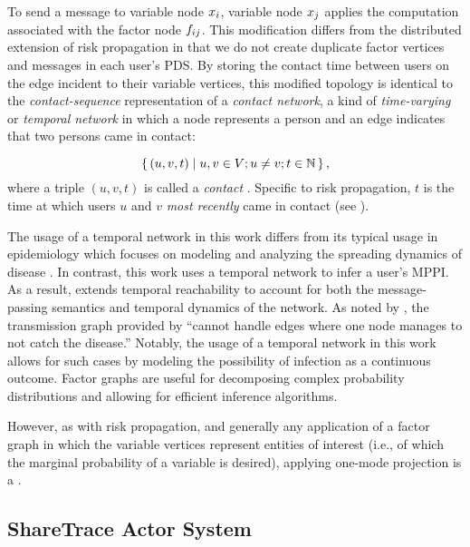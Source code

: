 To send a message to variable node $\vVariable[i]$, variable node $\vVariable[j]$ applies the computation associated with the factor node $\vFactor[ij]$. This modification differs from the distributed extension of risk propagation \cite{Ayday2021} in that we do not create duplicate factor vertices and messages in each user's PDS. By storing the contact time between users on the edge incident to their variable vertices, this modified topology is identical to the \emph{contact-sequence} representation of a \emph{contact network}, a kind of \emph{time-varying} or \emph{temporal network} in which a node represents a person and an edge indicates that two persons came in contact:

\begin{equation}
    \set{ (u, v, t) | u, v \in V; u \neq v; t \in \mathbb{N}}, \label{eq:contact-seq}
\end{equation}
%
where a triple $(u, v, t)$ is called a \emph{contact} \cite{Holme2012}. Specific to risk propagation, $t$ is the time at which users $u$ and $v$ \emph{most recently} came in contact (see ).

The usage of a temporal network in this work differs from its typical usage in epidemiology which focuses on modeling and analyzing the spreading dynamics of disease \cite{Riolo2001, Danon2011, Lokhov2014, Craft2015, Pastor-Satorras2015, Koher2019, Zino2021}. In contrast, this work uses a temporal network to infer a user's MPPI. As a result,  extends temporal reachability to account for both the message-passing semantics and temporal dynamics of the network. As noted by \cite{Holme2012}, the transmission graph provided by \cite{Riolo2001} ``cannot handle edges where one node manages to not catch the disease.'' Notably, the usage of a temporal network in this work allows for such cases by modeling the possibility of infection as a continuous outcome.
Factor graphs are useful for decomposing complex probability distributions and allowing for efficient inference algorithms.

However, as with risk propagation, and generally any application of a factor graph in which the variable vertices represent entities of interest (i.e., of which the marginal probability of a variable is desired), applying one-mode projection is a .

\subsection{ShareTrace Actor System}

